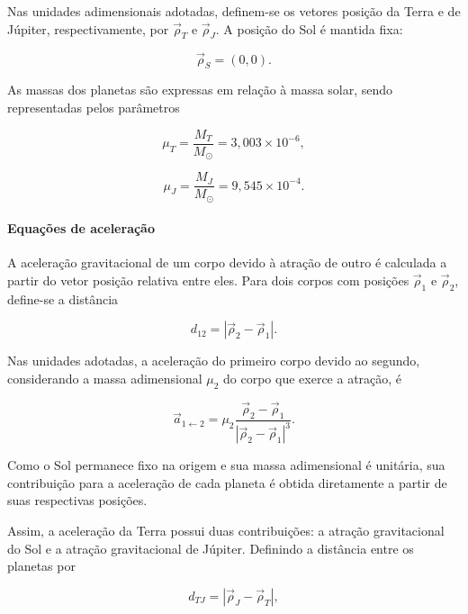 \documentclass[12pt,a4paper]{article}
\begin{document}
Nas unidades adimensionais adotadas, definem-se os vetores posição da Terra e de Júpiter, respectivamente, por $\vec{\rho}_T$ e $\vec{\rho}_J$. A posição do Sol é mantida fixa:

\begin{equation}
    \vec{\rho}_S=(0,0).
\end{equation}

As massas dos planetas são expressas em relação à massa solar, sendo representadas pelos parâmetros

\begin{equation}
    \mu_T=\frac{M_T}{M_{\odot}}=3,003\times10^{-6},
\end{equation}

\begin{equation}
    \mu_J=\frac{M_J}{M_{\odot}}=9,545\times10^{-4}.
\end{equation}

\paragraph{Equações de aceleração}

A aceleração gravitacional de um corpo devido à atração de outro é calculada a partir do vetor posição relativa entre eles. Para dois corpos com posições $\vec{\rho}_1$ e $\vec{\rho}_2$, define-se a distância

\begin{equation}
    d_{12}=|\vec{\rho}_2-\vec{\rho}_1|.
\end{equation}

Nas unidades adotadas, a aceleração do primeiro corpo devido ao segundo, considerando a massa adimensional $\mu_2$ do corpo que exerce a atração, é

\begin{equation}
    \vec{a}_{1\leftarrow 2}
    =
    \mu_2
    \frac{\vec{\rho}_2-\vec{\rho}_1}
    {|\vec{\rho}_2-\vec{\rho}_1|^3}.
\end{equation}

Como o Sol permanece fixo na origem e sua massa adimensional é unitária, sua contribuição para a aceleração de cada planeta é obtida diretamente a partir de suas respectivas posições.

Assim, a aceleração da Terra possui duas contribuições: a atração gravitacional do Sol e a atração gravitacional de Júpiter. Definindo a distância entre os planetas por

\begin{equation}
    d_{TJ}=|\vec{\rho}_J-\vec{\rho}_T|,
\end{equation}
\end{document}

